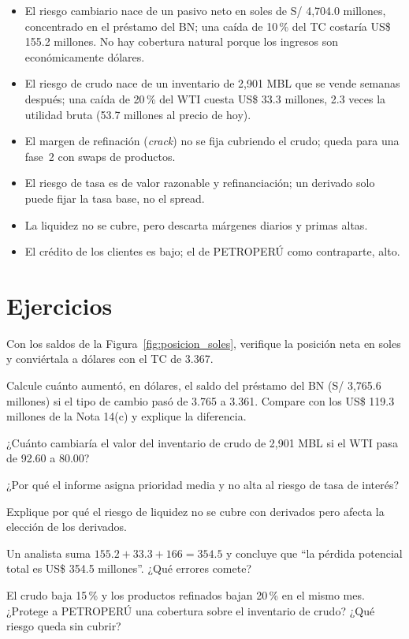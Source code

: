 \begin{resumen}
\begin{itemize}
\item El riesgo cambiario nace de un pasivo neto en soles de S/ 4,704.0 millones, concentrado en el préstamo del BN; una caída de 10\,\% del TC costaría US\$ 155.2 millones. No hay cobertura natural porque los ingresos son económicamente dólares.
\item El riesgo de crudo nace de un inventario de 2,901 MBL que se vende semanas después; una caída de 20\,\% del WTI cuesta US\$ 33.3 millones, 2.3 veces la utilidad bruta (53.7 millones al precio de hoy).
\item El margen de refinación (\emph{crack}) no se fija cubriendo el crudo; queda para una fase~2 con swaps de productos.
\item El riesgo de tasa es de valor razonable y refinanciación; un derivado solo puede fijar la tasa base, no el spread.
\item La liquidez no se cubre, pero descarta márgenes diarios y primas altas.
\item El crédito de los clientes es bajo; el de PETROPERÚ como contraparte, alto.
\end{itemize}
\end{resumen}

\section*{Ejercicios}

\ejercicio[cálculo] Con los saldos de la Figura~\ref{fig:posicion_soles}, verifique la posición neta en soles y conviértala a dólares con el TC de 3.367.

\ejercicio[cálculo] Calcule cuánto aumentó, en dólares, el saldo del préstamo del BN (S/ 3,765.6 millones) si el tipo de cambio pasó de 3.765 a 3.361. Compare con los US\$ 119.3 millones de la Nota 14(c) y explique la diferencia.

\ejercicio[cálculo] ¿Cuánto cambiaría el valor del inventario de crudo de 2,901 MBL si el WTI pasa de 92.60 a 80.00?

\ejercicio[conceptual] ¿Por qué el informe asigna prioridad media y no alta al riesgo de tasa de interés?

\ejercicio[conceptual] Explique por qué el riesgo de liquidez no se cubre con derivados pero afecta la elección de los derivados.

\ejercicio[conceptual] Un analista suma $155.2+33.3+166=354.5$ y concluye que \enquote{la pérdida potencial total es US\$ 354.5 millones}. ¿Qué errores comete?

\ejercicio[conceptual] El crudo baja 15\,\% y los productos refinados bajan 20\,\% en el mismo mes. ¿Protege a PETROPERÚ una cobertura sobre el inventario de crudo? ¿Qué riesgo queda sin cubrir?

